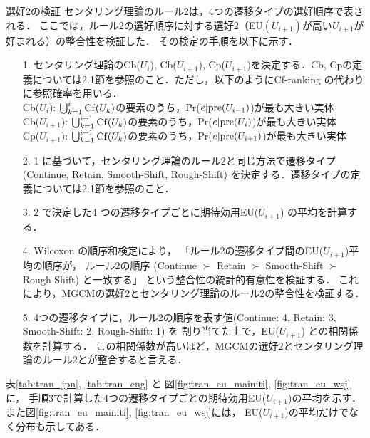 \documentclass[japanese]{jnlp_1.3e}
\renewcommand{\paragraph}{}
\begin{document}
\paragraph{選好2の検証}
センタリング理論のルール2は，4つの遷移タイプの選好順序で表される．
ここでは，ルール2の選好順序に対する選好2（EU$(U_{i+1})$が高い$U_{i+1}$が好まれる）の整合性を検証した．
その検定の手順を以下に示す．
\begin{itemize}
\item[1.] センタリング理論のCb($U_i$), Cb($U_{i+1}$), Cp($U_{i+1}$)を決定する．Cb, Cpの定義については2.1節を参照のこと．ただし，以下のようにCf-ranking の代わりに参照確率を用いる．\\
Cb($U_i$): $\bigcup_{k=1}^i {\rm Cf}(U_k)$の要素のうち，Pr($e|{\rm pre}(U_{i-1})$)が最も大きい実体\\
Cb($U_{i+1}$): $\bigcup_{k=1}^{i+1} {\rm Cf}(U_k)$の要素のうち，Pr($e|{\rm pre}(U_i)$)が最も大きい実体\\
Cp($U_{i+1}$): $\bigcup_{k=1}^{i+1} {\rm Cf}(U_k)$の要素のうち，Pr($e|{\rm pre}(U_{i+1})$)が最も大きい実体
\item[2.] 1 に基づいて，センタリング理論のルール2と同じ方法で遷移タイプ (Continue, Retain, Smooth-Shift, Rough-Shift) を決定する．遷移タイプの定義については2.1節を参照のこと．
\item[3.] 2 で決定した4 つの遷移タイプごとに期待効用EU($U_{i+1}$) の平均を計算する．
\item[4.] Wilcoxon の順序和検定により，
「ルール2の遷移タイプ間のEU($U_{i+1}$)平均の順序が，
ルール2の順序 (Continue $\succ$ Retain $\succ$ Smooth-Shift $\succ$ Rough-Shift) と一致する」
という整合性の統計的有意性を検証する．
これにより，MGCMの選好2とセンタリング理論のルール2の整合性を検証する．
\item[5.] 4つの遷移タイプに，ルール2の順序を表す値(Continue: 4, Retain: 3, Smooth-Shift: 2, Rough-Shift: 1) を
割り当てた上で，EU($U_{i+1}$) との相関係数を計算する．
この相関係数が高いほど，MGCMの選好2とセンタリング理論のルール2とが整合すると言える．
\end{itemize}





表\ref{tab:tran_jpn}, \ref{tab:tran_eng} と
図\ref{fig:tran_eu_mainiti}, \ref{fig:tran_eu_wsj} に，
手順3で計算した4つの遷移タイプごとの期待効用EU($U_{i+1}$)の平均を示す．
また図\ref{fig:tran_eu_mainiti}, \ref{fig:tran_eu_wsj}には，
EU($U_{i+1}$)の平均だけでなく分布も示してある．
\end{document}
